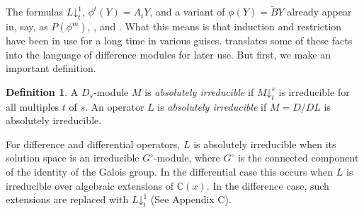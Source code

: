 \documentclass[11pt,reqno]{amsart}
\theoremstyle{definition}
\newtheorem{definition}[theorem]{Definition}
\newcommand{\pda}{\mathord{\downarrow}}
\begin{document}
The formulas $L\pda^{1}_{t}$, $\phi^{t}(Y)=A_{t}Y$, and a variant of $\phi(Y)=\tilde{B}Y$ already appear in, say, \cite[Lemma 5.3]{hendricks1999solving} as $P(\phi^{m})$, \cite[page 20]{put2006galois}, and \cite[page 245]{hendricks1999solving}.
What this means is that induction and restriction have been in use for a long time in various guises.  translates some of these facts into the language of difference modules for later use. But first, we make an important definition.
\begin{definition}
\label{def:absolute-irreducibility}
    A $D_s$-module $M$ is \emph{absolutely irreducible} if $M\pda^s_t$ is irreducible for all multiples $t$ of $s$. An operator $L$ is \emph{absolutely irreducible} if $M = D/DL$ is absolutely irreducible.
\end{definition}

For difference and differential operators, $L$
is absolutely irreducible when its solution space is 
an irreducible $G^\circ$-module, where $G^\circ$ is the connected component of the identity of the Galois group. In the differential case this occurs when $L$ is irreducible over algebraic extensions
of $\mathbb{C}(x)$. In the difference case, such extensions are replaced with $L\pda^1_t$ (See Appendix C).
\end{document}
